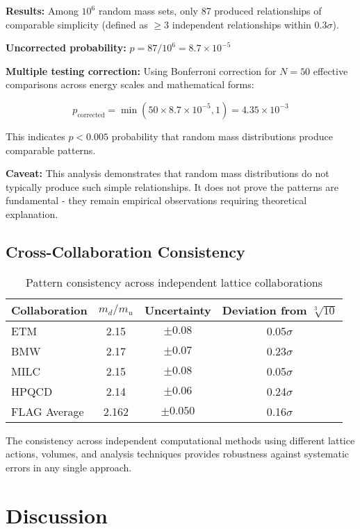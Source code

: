 \documentclass[12pt]{article}
\begin{document}
\textbf{Results:} Among $10^6$ random mass sets, only 87 produced relationships of comparable simplicity (defined as $\geq 3$ independent relationships within $0.3\sigma$).

\textbf{Uncorrected probability:} $p = 87/10^6 = 8.7 \times 10^{-5}$

\textbf{Multiple testing correction:} Using Bonferroni correction for $N = 50$ effective comparisons across energy scales and mathematical forms:

\begin{equation}
p_{\text{corrected}} = \min(50 \times 8.7 \times 10^{-5}, 1) = 4.35 \times 10^{-3}
\end{equation}

This indicates $p < 0.005$ probability that random mass distributions produce comparable patterns.

\textbf{Caveat:} This analysis demonstrates that random mass distributions do not typically produce such simple relationships. It does not prove the patterns are fundamental - they remain empirical observations requiring theoretical explanation.

\subsection{Cross-Collaboration Consistency}

\begin{table}[h!]
\centering
\caption{Pattern consistency across independent lattice collaborations}
\begin{tabular}{lccc}
\toprule
Collaboration & $m_d/m_u$ & Uncertainty & Deviation from $\sqrt[3]{10}$ \\
\midrule
ETM & 2.15 & $\pm 0.08$ & 0.05$\sigma$ \\
BMW & 2.17 & $\pm 0.07$ & 0.23$\sigma$ \\
MILC & 2.15 & $\pm 0.08$ & 0.05$\sigma$ \\
HPQCD & 2.14 & $\pm 0.06$ & 0.24$\sigma$ \\
FLAG Average & 2.162 & $\pm 0.050$ & 0.16$\sigma$ \\
\bottomrule
\end{tabular}
\end{table}

The consistency across independent computational methods using different lattice actions, volumes, and analysis techniques provides robustness against systematic errors in any single approach.

\section{Discussion}
\end{document}

